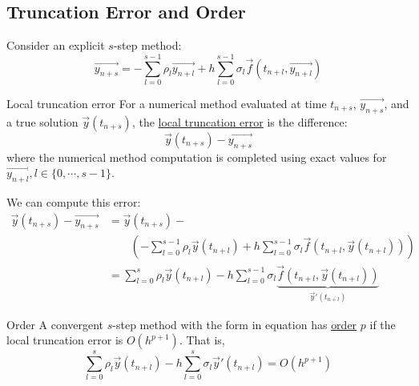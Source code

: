 \documentclass[../Main.tex]{subfiles}
\begin{document}
\subsection{Truncation Error and Order}
Consider an explicit $s$-step method:
\begin{equation*}
    \vec{y_{n+s}} = -\sum_{l=0}^{s-1} \rho_l \vec{y_{n+l}} + h\sum_{l=0}^{s-1} \sigma_l \vec{f}(t_{n + l}, \vec{y_{n + l}})
\end{equation*}
\begin{definition}{Local truncation error}
    For a numerical method evaluated at time $t_{n + s}$, $\vec{y_{n + s}}$, and a true solution $\vec{y}(t_{n + s})$, the \underline{local truncation error} is the difference:
    \begin{equation*}
        \vec{y}(t_{n + s}) - \vec{y_{n + s}}
    \end{equation*}
    where the numerical method computation is completed using exact values for $\vec{y_{n + l}}, l \in \{0, \cdots, s-1\}$.
\end{definition}
We can compute this error:
\begin{align*}
    \vec{y}(t_{n + s}) - \vec{y_{n + s}} &= \vec{y}(t_{n + s}) -\\
    &\qquad \left(-\sum_{l=0}^{s-1} \rho_l \vec{y}(t_{n + l}) + h \sum_{l=0}^{s-1} \sigma_l \vec{f}(t_{n + l}, \vec{y}(t_{n + l}))\right) \\
    &= \sum_{l=0}^{s} \rho_l \vec{y}(t_{n + l}) - h \sum_{l = 0}^{s-1} \sigma_l \underbrace{\vec{f}(t_{n + l}, \vec{y}(t_{n + l}))}_{\vec{y}'(t_{n + l})}
\end{align*}
\begin{definition}{Order}
    A convergent $s$-step method with the form in equation  has \underline{order} $p$ if the local truncation error is $O(h^{p+1})$. That is,
    \begin{equation}
        \sum_{l=0}^{s} \rho_l \vec{y}(t_{n + l}) - h \sum_{l=0}^{s} \sigma_l \vec{y}'(t_{n + l}) = O(h^{p+1})
        \label{eqnMultistepOrder}
    \end{equation}
\end{definition}
\end{document}
